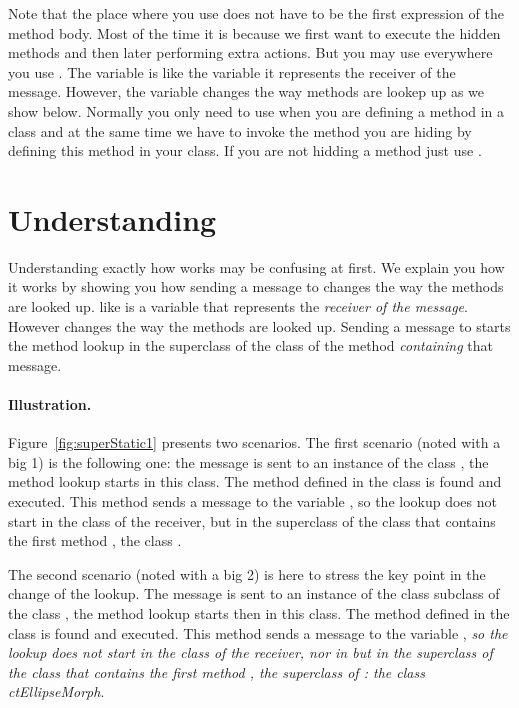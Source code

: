 Note that the place where you use  does not have to be the first expression of the method body. Most of the time it is because we first want to execute the hidden methods and then later performing extra actions. But you may use  everywhere you use . The variable  is like the variable  it represents the receiver of the message. However, the variable  changes the way methods are lookep up as we show below. 
Normally you only need to use  when you are defining a method in a class and at the same time we have to invoke the method you are hiding by defining this method in your class. If you are not hidding a method just use .


\section{Understanding } 
Understanding exactly how  works may be confusing at first. We explain you how it works by showing you how sending a message to  changes the way the methods are looked up.  like  is a variable that represents the \emph{receiver of the message}. However  changes the way the methods are looked up. Sending a message to  starts the method lookup in the superclass of the class of the method \emph{containing} that message.

\paragraph{Illustration.}
Figure~\ref{fig:superStatic1} presents two scenarios. The first scenario (noted with a  big 1) is the following one: the message  is sent to an instance of the class , the method lookup starts in this class. The method  defined in the class  is found and executed. This method sends a message  to the variable , so the lookup does not start in the class of the receiver,  but in the superclass of the class that contains the first method , the class . 

The second scenario (noted with a big 2) is here to stress the key point in the change of the lookup. The message  is sent to an instance of the class  subclass of the class , the method lookup starts then in this class. The method  defined in the class  is found and executed. This method sends a message  to the variable , \emph{so the lookup does not start in the class of the receiver,  nor in   but in the superclass of the class that contains the first method , the superclass of : the class ct{EllipseMorph}}. 

